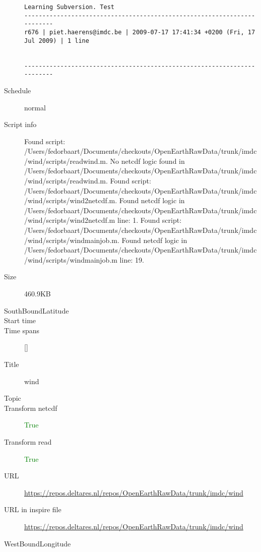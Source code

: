 \documentclass[9]{report}
\begin{document}
\begin{description}
\begin{verbatim}
Learning Subversion. Test
------------------------------------------------------------------------
r676 | piet.haerens@imdc.be | 2009-07-17 17:41:34 +0200 (Fri, 17 Jul 2009) | 1 line


------------------------------------------------------------------------

\end{verbatim}
  \item[Schedule] normal
  \item[Script info] Found script: /Users/fedorbaart/Documents/checkouts/OpenEarthRawData/trunk/imdc/wind/scripts/readwind.m.
No netcdf logic found in /Users/fedorbaart/Documents/checkouts/OpenEarthRawData/trunk/imdc/wind/scripts/readwind.m.
Found script: /Users/fedorbaart/Documents/checkouts/OpenEarthRawData/trunk/imdc/wind/scripts/wind2netcdf.m.
Found netcdf logic in /Users/fedorbaart/Documents/checkouts/OpenEarthRawData/trunk/imdc/wind/scripts/wind2netcdf.m line: 1.
Found script: /Users/fedorbaart/Documents/checkouts/OpenEarthRawData/trunk/imdc/wind/scripts/windmainjob.m.
Found netcdf logic in /Users/fedorbaart/Documents/checkouts/OpenEarthRawData/trunk/imdc/wind/scripts/windmainjob.m line: 19.
  \item[Size] 460.9KB
  \item[SouthBoundLatitude] 
  \item[Start time] 
  \item[Time spans] []
  \item[Title]  wind 
  \item[Topic] 
  \item[Transform netcdf] \textcolor{green}{True}
  \item[Transform read] \textcolor{green}{True}
  \item[URL] \href{https://repos.deltares.nl/repos/OpenEarthRawData/trunk/imdc/wind}{https://repos.deltares.nl/repos/OpenEarthRawData/trunk/imdc/wind}
  \item[URL in inspire file] \href{https://repos.deltares.nl/repos/OpenEarthRawData/trunk/imdc/wind}{https://repos.deltares.nl/repos/OpenEarthRawData/trunk/imdc/wind}
  \item[WestBoundLongitude] 
\end{description}
\end{document}
